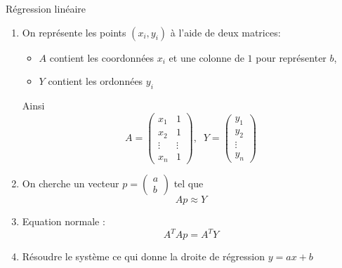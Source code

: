 \begin{parag}{Régression linéaire}
    \begin{enumerate}
        \item On représente les points $(x_i, y_i)$ à l'aide de deux matrices:
        \begin{itemize}
            \item $A$ contient les coordonnées $x_i$ et une colonne de $1$ pour représenter $b$, 
            \item $Y$ contient les ordonnées $y_i$
        \end{itemize}
        Ainsi
        \[A = \begin{pmatrix}
            x_1 & 1\\
            x_2 & 1\\
            \vdots & \vdots\\
            x_n & 1
        \end{pmatrix}, \; \; Y = \begin{pmatrix}
            y_1 \\ y_2 \\ \vdots \\ y_n
        \end{pmatrix}\]
        \item On cherche un vecteur $p = \begin{pmatrix}
            a \\ b
        \end{pmatrix}$ tel que
        \[Ap \approx Y\]
        \item Equation normale : 
        \[A^TAp = A^TY\]
        \item Résoudre le système ce qui donne la droite de régression $y = ax + b$
    \end{enumerate}
\end{parag}
